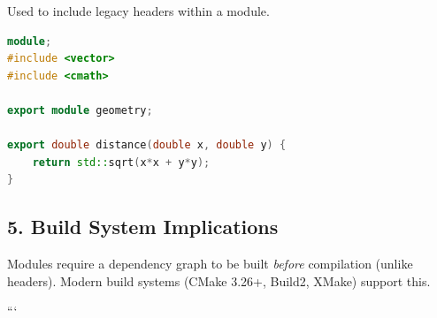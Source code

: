 Used to include legacy headers within a module.

\begin{lstlisting}[language={C++}]
module;
#include <vector>
#include <cmath>

export module geometry;

export double distance(double x, double y) {
    return std::sqrt(x*x + y*y);
}
\end{lstlisting}

\hypertarget{build-system-implications}{%
\subsection{5. Build System
Implications}\label{build-system-implications}}

Modules require a dependency graph to be built \emph{before} compilation
(unlike headers). Modern build systems (CMake 3.26+, Build2, XMake)
support this.

```
